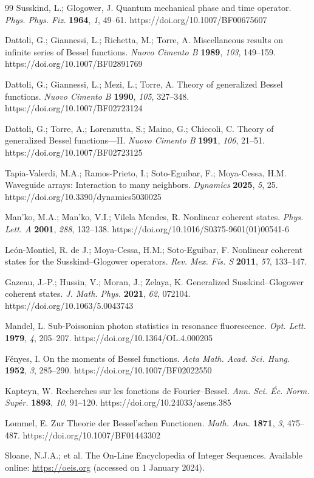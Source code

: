 \documentclass[10pt]{NSP1}
\begin{document}
\begin{thebibliography}{99}
Susskind, L.; Glogower, J. Quantum mechanical phase and time operator. 
\textit{Phys. Phys. Fiz.} \textbf{1964}, \textit{1}, 49--61.
https://doi.org/10.1007/BF00675607

Dattoli, G.; Giannessi, L.; Richetta, M.; Torre, A. Miscellaneous results on infinite series of Bessel functions. 
\textit{Nuovo Cimento B} \textbf{1989}, \textit{103}, 149--159.
https://doi.org/10.1007/BF02891769

Dattoli, G.; Giannessi, L.; Mezi, L.; Torre, A. Theory of generalized Bessel functions. 
\textit{Nuovo Cimento B} \textbf{1990}, \textit{105}, 327--348.
https://doi.org/10.1007/BF02723124

Dattoli, G.; Torre, A.; Lorenzutta, S.; Maino, G.; Chiccoli, C. Theory of generalized Bessel functions---II. 
\textit{Nuovo Cimento B} \textbf{1991}, \textit{106}, 21--51.
https://doi.org/10.1007/BF02723125

Tapia-Valerdi, M.A.; Ramos-Prieto, I.; Soto-Eguibar, F.; Moya-Cessa, H.M. Waveguide arrays: Interaction to many neighbors. 
\textit{Dynamics} \textbf{2025}, \textit{5}, 25.
https://doi.org/10.3390/dynamics5030025


Man'ko, M.A.; Man'ko, V.I.; Vilela Mendes, R. Nonlinear coherent states. 
\textit{Phys. Lett. A} \textbf{2001}, \textit{288}, 132--138.
https://doi.org/10.1016/S0375-9601(01)00541-6

Le\'{o}n-Montiel, R. de J.; Moya-Cessa, H.M.; Soto-Eguibar, F. Nonlinear coherent states for the Susskind--Glogower operators. 
\textit{Rev. Mex. F\'{i}s. S} \textbf{2011}, \textit{57}, 133--147.

Gazeau, J.-P.; Hussin, V.; Moran, J.; Zelaya, K. Generalized Susskind--Glogower coherent states. 
\textit{J. Math. Phys.} \textbf{2021}, \textit{62}, 072104.
https://doi.org/10.1063/5.0043743

Mandel, L. Sub-Poissonian photon statistics in resonance fluorescence. 
\textit{Opt. Lett.} \textbf{1979}, \textit{4}, 205--207.
https://doi.org/10.1364/OL.4.000205


F\'{e}nyes, I. On the moments of Bessel functions. 
\textit{Acta Math. Acad. Sci. Hung.} \textbf{1952}, \textit{3}, 285--290.
https://doi.org/10.1007/BF02022550

Kapteyn, W. Recherches sur les fonctions de Fourier--Bessel. 
\textit{Ann. Sci. \'{E}c. Norm. Sup\'{e}r.} \textbf{1893}, \textit{10}, 91--120.
https://doi.org/10.24033/asens.385

Lommel, E. Zur Theorie der Bessel'schen Functionen. 
\textit{Math. Ann.} \textbf{1871}, \textit{3}, 475--487.
https://doi.org/10.1007/BF01443302

Sloane, N.J.A.; et al. The On-Line Encyclopedia of Integer Sequences. 
Available online: \url{https://oeis.org} (accessed on 1 January 2024).


\end{thebibliography}
\end{document}
